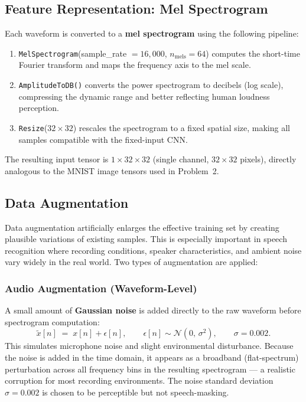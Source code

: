 \documentclass[12pt, a4paper]{article}
\begin{document}
\subsection{Feature Representation: Mel Spectrogram}

Each waveform is converted to a \textbf{mel spectrogram} using the following pipeline:
\begin{enumerate}
    \item \texttt{MelSpectrogram}(sample\_rate $= 16{,}000$,\; $n_{\mathrm{mels}} = 64$)
          computes the short-time Fourier transform and maps the frequency axis to the
          mel scale.
    \item \texttt{AmplitudeToDB()} converts the power spectrogram to decibels
          (log scale), compressing the dynamic range and better reflecting human
          loudness perception.
    \item \texttt{Resize}($32\times32$) rescales the spectrogram to a fixed spatial
          size, making all samples compatible with the fixed-input CNN.
\end{enumerate}

The resulting input tensor is $1\times32\times32$ (single channel, $32\times32$ pixels),
directly analogous to the MNIST image tensors used in Problem~2.

\subsection{Data Augmentation}

Data augmentation artificially enlarges the effective training set by creating plausible
variations of existing samples. This is especially important in speech recognition
where recording conditions, speaker characteristics, and ambient noise vary widely in
the real world. Two types of augmentation are applied:

\subsubsection{Audio Augmentation (Waveform-Level)}

A small amount of \textbf{Gaussian noise} is added directly to the raw waveform before
spectrogram computation:
\[
    \tilde{x}[n] \;=\; x[n] + \epsilon[n], \qquad
    \epsilon[n] \sim \mathcal{N}(0,\,\sigma^{2}), \qquad
    \sigma = 0.002.
\]
This simulates microphone noise and slight environmental disturbance. Because the
noise is added in the time domain, it appears as a broadband (flat-spectrum) perturbation
across all frequency bins in the resulting spectrogram --- a realistic corruption for
most recording environments. The noise standard deviation $\sigma = 0.002$ is chosen
to be perceptible but not speech-masking.
\end{document}
